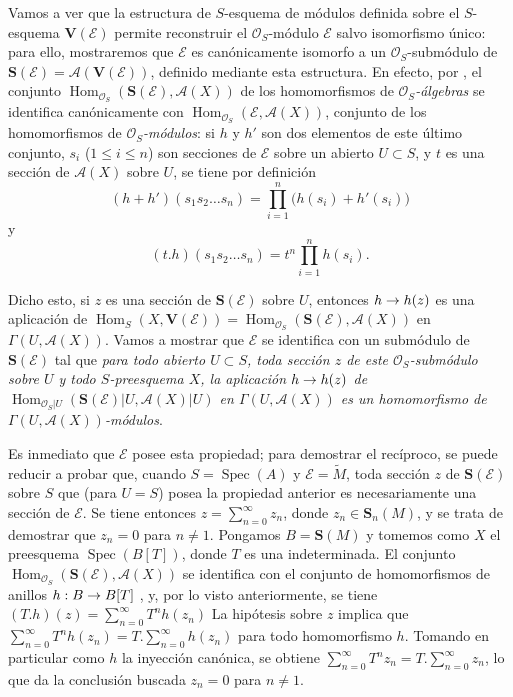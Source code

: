 \documentclass[oneside,10pt]{amsart}
\makeatletter
\renewcommand{\leq}{\leqslant}
\newcommand{\ega@arrow}[2]{\mathchoice{#1}{#2}{#2}{#2}}
\renewcommand{\to}{\ega@arrow{\longrightarrow}{\rightarrow}}
\newcommand{\oldpage}[2][]{\marginnote{\normalfont\footnotesize\textbf{#1}~|~#2}\ignorespaces}
\let\EGAOriginalLabel\label
\renewcommand{\label}[1]{\phantomsection\EGAOriginalLabel{#1}}
\makeatother
\begin{document}
\begin{env}[1.7.14]
\label{II.1.7.14-fr}
Vamos a ver que la estructura de $S$-esquema de módulos definida sobre el $S$-esquema $\mathbf{V}(\mathcal{E})$ permite reconstruir el $\mathcal{O}_S$-módulo $\mathcal{E}$ salvo isomorfismo único: para ello, mostraremos que $\mathcal{E}$ es canónicamente isomorfo a un $\mathcal{O}_S$-submódulo de $\mathbf{S}(\mathcal{E})=\mathcal{A}(\mathbf{V}(\mathcal{E}))$, definido mediante esta estructura.
En efecto, por , el conjunto $\operatorname{Hom}_{\mathcal{O}_S}(\mathbf{S}(\mathcal{E}),
\mathcal{A}(X))$ de los homomorfismos de \emph{$\mathcal{O}_S$-álgebras} se identifica canónicamente con $\operatorname{Hom}_{\mathcal{O}_S}(\mathcal{E},\mathcal{A}(X))$, conjunto de los homomorfismos de \emph{$\mathcal{O}_S$-módulos}: si $h$ y $h'$ son dos elementos de este último conjunto, $s_i$ ($1\leq i\leq n$) son secciones de $\mathcal{E}$ sobre un abierto $U\subset S$, y $t$ es una sección de $\mathcal{A}(X)$ sobre $U$, se tiene por definición
\[
  (h+h')(s_1s_2\ldots s_n)
  =\prod_{i=1}^n\bigl(h(s_i)+h'(s_i)\bigr)
\]
y
\[
  (t.h)(s_1s_2\ldots s_n)=t^n\prod_{i=1}^n h(s_i).
\]

Dicho esto, si $z$ es una sección de $\mathbf{S}(\mathcal{E})$ sobre $U$, entonces $h\to h(z)$ es una aplicación de
$\operatorname{Hom}_S(X,\mathbf{V}(\mathcal{E}))
=\operatorname{Hom}_{\mathcal{O}_S}(\mathbf{S}(\mathcal{E}),
\mathcal{A}(X))$
en $\Gamma(U,\mathcal{A}(X))$.
Vamos a
\oldpage[II]{19}
mostrar que $\mathcal{E}$ se identifica con un submódulo de $\mathbf{S}(\mathcal{E})$ tal que \emph{para todo abierto $U\subset S$, toda sección $z$ de este $\mathcal{O}_S$-submódulo sobre $U$ y todo $S$-preesquema $X$, la aplicación $h\to h(z)$ de $\operatorname{Hom}_{\mathcal{O}_S|U}(\mathbf{S}(\mathcal{E})|U,
\mathcal{A}(X)|U)$ en $\Gamma(U,\mathcal{A}(X))$ es un homomorfismo de $\Gamma(U,\mathcal{A}(X))$-módulos}.

Es inmediato que $\mathcal{E}$ posee esta propiedad; para demostrar el recíproco, se puede reducir a probar que, cuando $S=\operatorname{Spec}(A)$ y $\mathcal{E}=\widetilde{M}$, toda sección $z$ de $\mathbf{S}(\mathcal{E})$ sobre $S$ que (para $U=S$) posea la propiedad anterior es necesariamente una sección de $\mathcal{E}$.
Se tiene entonces $z=\sum_{n=0}^{\infty}z_n$, donde $z_n\in\mathbf{S}_n(M)$, y se trata de demostrar que $z_n=0$ para $n\ne1$.
Pongamos $B=\mathbf{S}(M)$ y tomemos como $X$ el preesquema $\operatorname{Spec}(B[T])$, donde $T$ es una indeterminada.
El conjunto $\operatorname{Hom}_{\mathcal{O}_S}(\mathbf{S}(\mathcal{E}),
\mathcal{A}(X))$ se identifica con el conjunto de homomorfismos de anillos $h:B\to B[T]$ , y, por lo visto anteriormente, se tiene
$(T.h)(z)=\sum_{n=0}^{\infty}T^nh(z_n)$
La hipótesis sobre $z$ implica que
$\sum_{n=0}^{\infty}T^nh(z_n)=T.\sum_{n=0}^{\infty}h(z_n)$
para todo homomorfismo $h$.
Tomando en particular como $h$ la inyección canónica, se obtiene
$\sum_{n=0}^{\infty}T^nz_n=T.\sum_{n=0}^{\infty}z_n$,
lo que da la conclusión buscada $z_n=0$ para $n\ne1$.
\end{env}
\end{document}
